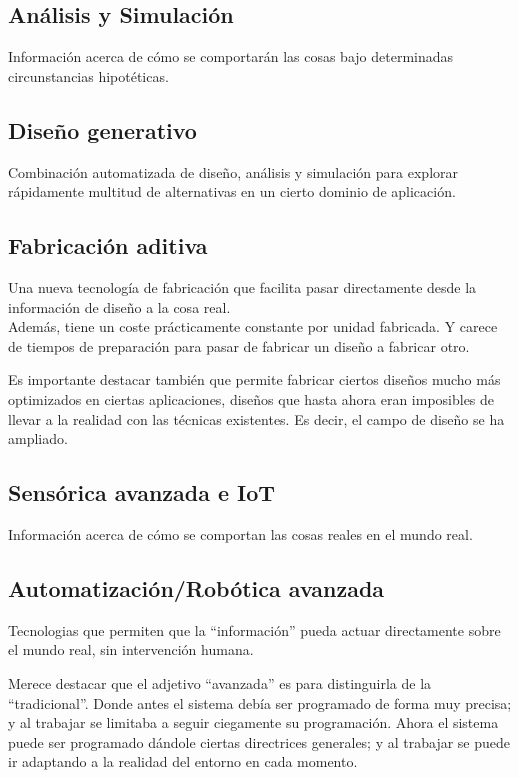 \documentclass[spanish,12pt,a4paper,final,oneside]{book}
\begin{document}
\subsection*{Análisis y Simulación}
Información acerca de cómo se comportarán las cosas bajo determinadas circunstancias hipotéticas.

\subsection*{Diseño generativo}
Combinación automatizada de diseño, análisis y simulación para explorar rápidamente multitud de alternativas en un cierto dominio de aplicación.

\subsection*{Fabricación aditiva}
Una nueva tecnología de fabricación que facilita pasar directamente desde la información de diseño a la cosa real.
\\Además, tiene un coste prácticamente constante por unidad fabricada. Y carece de tiempos de preparación para pasar de fabricar un diseño a fabricar otro.

Es importante destacar también que permite fabricar ciertos diseños mucho más optimizados en ciertas aplicaciones, diseños que hasta ahora eran imposibles de llevar a la realidad con las técnicas existentes. Es decir, el campo de diseño se ha ampliado.

\subsection*{Sensórica avanzada e IoT}
Información acerca de cómo se comportan las cosas reales en el mundo real.

\subsection*{Automatización/Robótica avanzada}
Tecnologias que permiten que la ``información'' pueda actuar directamente sobre el mundo real, sin intervención humana.

Merece destacar que el adjetivo ``avanzada'' es para distinguirla de la ``tradicional''. Donde antes el sistema debía ser programado de forma muy precisa; y al trabajar se limitaba a seguir ciegamente su programación. Ahora el sistema puede ser programado dándole ciertas directrices generales; y al trabajar se puede ir adaptando a la realidad del entorno en cada momento. 
\end{document}

